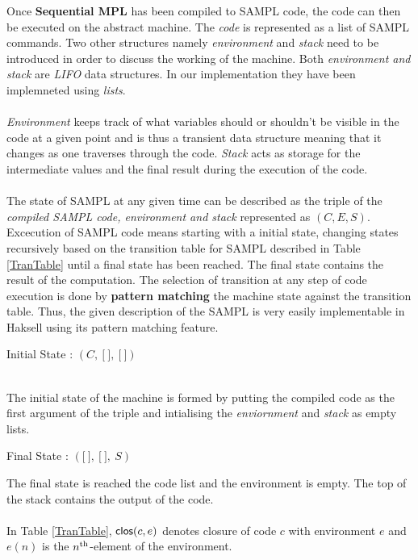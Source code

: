 \documentclass[11pt]{article}
\newcommand{\<}{\langle}
\renewcommand{\>}{\rangle}
\begin{document}
Once {\bf Sequential MPL} has been compiled to SAMPL code, the code can then be executed on the abstract machine. The {\em code} is represented as a list of SAMPL commands. Two other structures namely {\em environment} and {\em stack} need to be introduced in order to discuss the working of the machine. Both {\em environment and stack} are {\em LIFO} data structures. In our implementation they have been implemneted using {\em lists}. 
~~\\~~\\
{\em Environment} keeps track of what variables should or shouldn't be visible in the code at a given point and is thus a transient data structure meaning that it changes as one traverses through the code. {\em Stack} acts as storage for the intermediate values and the final result during the execution of the code. 
~~\\~~\\ 
The state of SAMPL at any given time can be described as the triple of the {\em compiled SAMPL code, environment and stack} represented as $(C,E,S)$. Excecution of SAMPL code means starting with a initial state, changing states recursively based on the transition table for SAMPL described in Table \ref {TranTable} until a final state has been reached. The final state contains the result of the computation. The selection of transition at any step of code execution is done by {\bf pattern matching} the machine state against the transition table. Thus, the given description of the SAMPL is very easily implementable in Haksell using its pattern matching feature.
~~\\
\begin{center}
Initial State : $(C,~\lbrack~\rbrack,~\lbrack~\rbrack)$
\end{center}
~~\\
The initial state of the machine is formed by putting the compiled code as the first argument of the triple and intialising the {\em enviornment} and {\em stack} as empty lists.
~~\\
\begin{center}
Final State : $(\lbrack~\rbrack,~\lbrack~\rbrack,~S)$
~~\\
\end{center}
The final state is reached the code list and the environment is empty. The top of the stack contains the output of the code.
~~\\~~\\
In Table \ref {TranTable}, $ {\sf clos}(c,e) $ denotes closure of code $c$ with environment $e$ and $e(n)$ is the $n^{\rm th}$-element of the environment.
\end{document}
